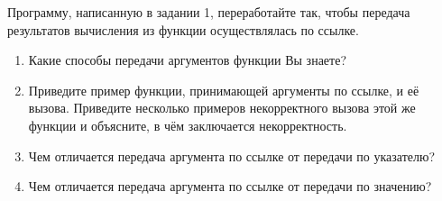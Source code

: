 \labtask

Программу, написанную в задании 1, переработайте так, чтобы передача результатов вычисления из функции осуществлялась по ссылке.

\labworkquestions

\begin{enumerate}
	\item
		Какие способы передачи аргументов функции Вы знаете?
	\item
		Приведите пример функции, принимающей аргументы по ссылке, и её вызова.
		Приведите несколько примеров некорректного вызова этой же функции и объясните, в чём заключается некорректность.
	\item
		Чем отличается передача аргумента по ссылке от передачи по указателю?
	\item
		Чем отличается передача аргумента по ссылке от передачи по значению?
\end{enumerate}



